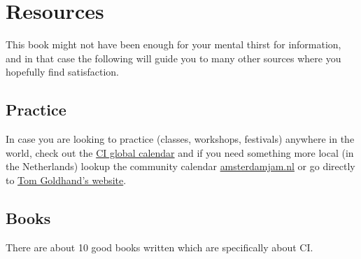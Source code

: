 \section{Resources}\label{sec:resources}

This book might not have been enough for your mental thirst for information, and in that case the following will guide you to many other sources where you hopefully find satisfaction.

\subsection{Practice}\label{subsec:practice}

In case you are looking to practice (classes, workshops, festivals) anywhere in the world, check out the \href{https://ciglobalcalendar.net}{CI global calendar} and if you need something more local (in the Netherlands) lookup the community calendar \href{https://amsterdamjam.nl}{amsterdamjam.nl} or go directly to \href{https://tomgoldhand.com}{Tom Goldhand's website}.

\subsection{Books}\label{subsec:books}

There are about 10 good books written which are specifically about CI.

